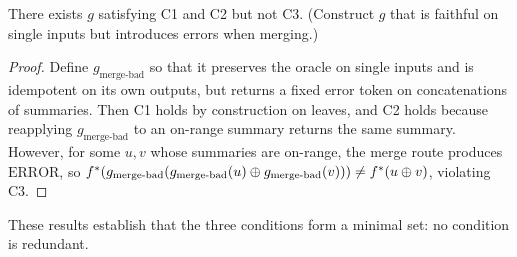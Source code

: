 \begin{proposition}[C3 is Independent of C1, C2]
There exists $g$ satisfying C1 and C2 but not C3. (Construct $g$ that is faithful on single inputs but introduces errors when merging.)
\end{proposition}

\begin{proof}
Define $g_{\text{merge-bad}}$ so that it preserves the oracle on single inputs and is idempotent on its own outputs, but returns a fixed error token on concatenations of summaries. Then C1 holds by construction on leaves, and C2 holds because reapplying $g_{\text{merge-bad}}$ to an on-range summary returns the same summary. However, for some $u,v$ whose summaries are on-range, the merge route produces $\text{ERROR}$, so
$f^{\ast}(g_{\text{merge-bad}}(g_{\text{merge-bad}}(u)\oplus g_{\text{merge-bad}}(v)))\ne f^{\ast}(u\oplus v)$,
violating C3.
\end{proof}

These results establish that the three conditions form a minimal set: no condition is redundant.
